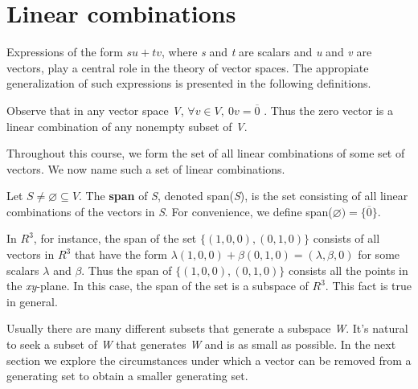 \section{Linear combinations}

Expressions of the form $su + tv$, where \textit s and \textit t are scalars and \textit u and \textit v are vectors, play a central role in the theory of vector spaces. The appropiate generalization of such expressions is presented in the following definitions.


\noindent Observe that in any vector space \textit V, $\forall v \in V, ~0v = \overline 0$ . Thus the zero vector is a linear combination of any nonempty subset of \textit V.

Throughout this course, we form the set of all linear combinations of some set of vectors. We now name such a set of linear combinations.

\dfn{} {
  Let $S \neq \varnothing \subseteq V$. The \textbf{span} of \textit S, denoted span(\textit S), is the set consisting of all linear combinations of the vectors in \textit S. For convenience, we define span($\varnothing) = \{\overline 0\}$.
}

In $R^3$, for instance, the span of the set $\{(1,0,0), (0,1,0)\}$ consists of all vectors in $R^3$ that have the form $\lambda(1,0,0) + \beta(0,1,0) = (\lambda, \beta, 0)$ for some scalars $\lambda$ and $\beta$. Thus the span of $\{(1,0,0), (0,1,0)\}$ consists all the points in the \textit{xy}-plane. In this case, the span of the set is a subspace of $R^3$. This fact is true in general.



Usually there are many different subsets that generate a subspace \textit W. It's natural to seek a subset of \textit W that generates \textit W and is as small as possible. In the next section we explore the circumstances under which a vector can be removed from a generating set to obtain a smaller generating set.


